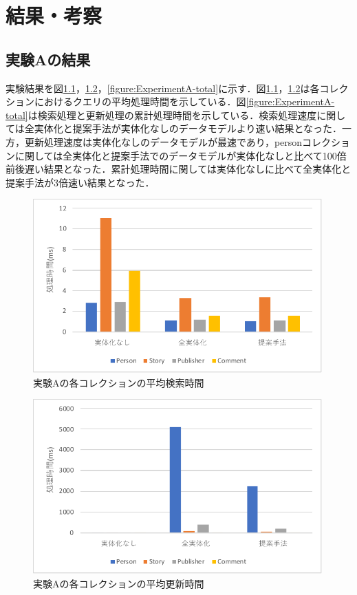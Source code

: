\documentclass[a4paper,11pt]{ujreport}
\begin{document}
\chapter{結果・考察}
\label{chap:Result}
\section{実験Aの結果}
実験結果を図\ref{figure:ExperimentA-find}，\ref{figure:ExperimentA-update}，\ref{figure:ExperimentA-total}に示す．図\ref{figure:ExperimentA-find}，\ref{figure:ExperimentA-update}は各コレクションにおけるクエリの平均処理時間を示している．図\ref{figure:ExperimentA-total}は検索処理と更新処理の累計処理時間を示している．検索処理速度に関しては全実体化と提案手法が実体化なしのデータモデルより速い結果となった．一方，更新処理速度は実体化なしのデータモデルが最速であり，personコレクションに関しては全実体化と提案手法でのデータモデルが実体化なしと比べて100倍前後遅い結果となった．累計処理時間に関しては実体化なしに比べて全実体化と提案手法が3倍速い結果となった．
\begin{figure}[htbp]
	\begin{center}
		\includegraphics[width=30em]{src/ExperimentA-find.pdf} %
	\end{center}
	\caption{実験Aの各コレクションの平均検索時間}
	\label{figure:ExperimentA-find}
\end{figure}
\begin{figure}[htbp]
	\begin{center}
		\includegraphics[width=30em]{src/ExperimentA-update.pdf} %
	\end{center}
	\caption{実験Aの各コレクションの平均更新時間}
	\label{figure:ExperimentA-update}
\end{figure}
\end{document}
